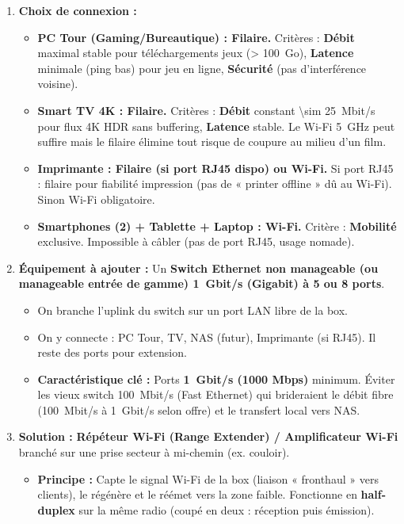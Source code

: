 \documentclass[11pt]{article}
\begin{document}
\begin{corrige}
\begin{enumerate}
    \item \textbf{Choix de connexion :}
        \begin{itemize}
            \item \textbf{PC Tour (Gaming/Bureautique) : Filaire.} Critères : \textbf{Débit} maximal stable pour téléchargements jeux (\SI{> 100}{Go}), \textbf{Latence} minimale (ping bas) pour jeu en ligne, \textbf{Sécurité} (pas d'interférence voisine).
            \item \textbf{Smart TV 4K : Filaire.} Critères : \textbf{Débit} constant \SI{\sim 25}{Mbit/s} pour flux 4K HDR sans buffering, \textbf{Latence} stable. Le Wi-Fi \SI{5}{GHz} peut suffire mais le filaire élimine tout risque de coupure au milieu d'un film.
            \item \textbf{Imprimante : Filaire (si port RJ45 dispo) ou Wi-Fi.} Si port RJ45 : filaire pour fiabilité impression (pas de « printer offline » dû au Wi-Fi). Sinon Wi-Fi obligatoire.
            \item \textbf{Smartphones (2) + Tablette + Laptop : Wi-Fi.} Critère : \textbf{Mobilité} exclusive. Impossible à câbler (pas de port RJ45, usage nomade).
        \end{itemize}
    \item \textbf{Équipement à ajouter :} Un \textbf{Switch Ethernet non manageable (ou manageable entrée de gamme) \SI{1}{Gbit/s} (Gigabit) à 5 ou 8 ports}.
        \begin{itemize}
            \item On branche l'uplink du switch sur un port LAN libre de la box.
            \item On y connecte : PC Tour, TV, NAS (futur), Imprimante (si RJ45). Il reste des ports pour extension.
            \item \textbf{Caractéristique clé :} Ports \textbf{\SI{1}{Gbit/s} (1000 Mbps)} minimum. Éviter les vieux switch \SI{100}{Mbit/s} (Fast Ethernet) qui brideraient le débit fibre (\SI{100}{Mbit/s} à \SI{1}{Gbit/s} selon offre) et le transfert local vers NAS.
        \end{itemize}
    \item \textbf{Solution :} \textbf{Répéteur Wi-Fi (Range Extender) / Amplificateur Wi-Fi} branché sur une prise secteur à mi-chemin (ex. couloir).
        \begin{itemize}
            \item \textbf{Principe :} Capte le signal Wi-Fi de la box (liaison « fronthaul » vers clients), le régénère et le réémet vers la zone faible. Fonctionne en \textbf{half-duplex} sur la même radio (coupé en deux : réception puis émission).

\end{itemize}
\end{enumerate}
\end{corrige}
\end{document}
